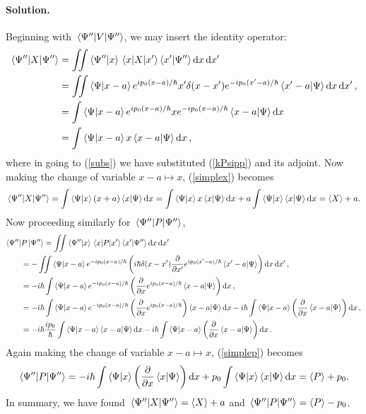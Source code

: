 \documentclass[11pt]{article}
\newcommand{\refeq}[1]{(\ref{#1})}
\newenvironment{solution}
{
    \paragraph{Solution.}
    \ignorespaces
}
{
}
\begin{document}
\begin{solution}
	Beginning with $\ev{V}{\Psi''}$, we may insert the identity operator:
	\begin{align}
		\ev{X}{\Psi''} &= \iint \braket{\Psi''}{x} \mel{x}{X}{x'} \braket{x'}{\Psi''} \dd{x} \dd{x'} \\
		&= \iint \braket{\Psi}{x - a} e^{i \po (x - a) / \hbar} x' \delta(x - x') e^{-i \po (x' - a) / \hbar} \braket{x' - a}{\Psi} \dd{x} \dd{x'}, \label{subs} \\
		&= \int \braket{\Psi}{x - a} e^{i \po (x - a) / \hbar} x e^{-i \po (x - a) / \hbar} \braket{x - a}{\Psi} \dd{x} \\
		&= \int \braket{\Psi}{x - a} x \braket{x - a}{\Psi} \dd{x}, \label{simplex}
	\end{align}
	where in going to \refeq{subs} we have substituted \refeq{kPsipp} and its adjoint.  Now making the change of variable $x - a \mapsto x$, \refeq{simplex} becomes
	\begin{equation}
		\ev{X}{\Psi''} = \int \braket{\Psi}{x} (x + a) \braket{x}{\Psi} \dd{x} = \int \braket{\Psi}{x} x \braket{x}{\Psi} \dd{x} + a \int \braket{\Psi}{x}\braket{x}{\Psi} \dd{x} = \ev{X} + a.
	\end{equation}
	Now proceeding similarly for $\ev{P}{\Psi''}$,
	\begin{align}
		\bra{\Psi''}&{P}\ket{\Psi''} = \iint \braket{\Psi''}{x} \mel{x}{P}{x'} \braket{x'}{\Psi''} \dd{x} \dd{x'} \\
		&= -\iint \braket{\Psi}{x - a} e^{-i p_0 (x - a) / \hbar} \left( i \hbar \delta(x - x') \pdv{}{x'} e^{i p_0 (x' - a) / \hbar} \braket{x' - a}{\Psi} \right) \dd{x} \dd{x'}, \\
		&= -i \hbar \int \braket{\Psi}{x - a} e^{-i p_0 (x - a) / \hbar} \left(\pdv{}{x} e^{i p_0 (x - a) / \hbar} \braket{x - a}{\Psi} \right) \dd{x}, \\
		&= -i \hbar \int \braket{\Psi}{x - a} e^{-i p_0 (x - a) / \hbar} \left(\pdv{}{x} e^{i p_0 (x - a) / \hbar} \right) \braket{x - a}{\Psi} \dd{x} - i \hbar \int \braket{\Psi}{x - a} \left(\pdv{}{x} \braket{x - a}{\Psi} \right) \dd{x}, \\
		&= -i \hbar \frac{i p_0}{\hbar} \int \braket{\Psi}{x - a} \braket{x - a}{\Psi} \dd{x} - i \hbar \int \braket{\Psi}{x - a} \left(\pdv{}{x} \braket{x - a}{\Psi} \right) \dd{x}. \label{simplep}
	\end{align}
	Again making the change of variable $x - a \mapsto x$, \refeq{simplep} becomes
	\begin{equation}
		\ev{P}{\Psi''} = -\ihb \int \braket{\Psi}{x} \left(\pdv{}{x} \braket{x}{\Psi} \right) \dd{x} + \po \int \braket{\Psi}{x} \braket{x}{\Psi} \dd{x} = \ev{P} + \po.
	\end{equation}
	In summary, we have found $\ev{X}{\Psi''} = \ev{X} + a$ and $\ev{P}{\Psi''} = \ev{P} - \po$.
\end{solution}
\end{document}
